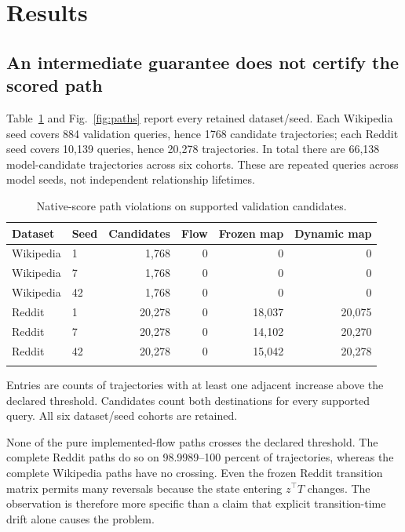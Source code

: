 \documentclass[pdflatex,sn-vancouver-num]{sn-jnl}
\theoremstyle{thmstyleone}
\begin{document}
\section{Results}\label{sec:results}
\subsection{An intermediate guarantee does not certify the scored path}
Table~\ref{tab:paths} and Fig.~\ref{fig:paths} report every retained dataset/seed. Each Wikipedia seed covers 884 validation queries, hence 1768 candidate trajectories; each Reddit seed covers 10,139 queries, hence 20,278 trajectories. In total there are 66,138 model-candidate trajectories across six cohorts. These are repeated queries across model seeds, not independent relationship lifetimes.

\begin{table}[t]
\caption{Native-score path violations on supported validation candidates.}\label{tab:paths}
\centering
\begin{tabular}{@{}llrrrr@{}}
\toprule
Dataset & Seed & Candidates & Flow & Frozen map & Dynamic map \\
\midrule
Wikipedia & 1 & 1,768 & 0 & 0 & 0 \\
Wikipedia & 7 & 1,768 & 0 & 0 & 0 \\
Wikipedia & 42 & 1,768 & 0 & 0 & 0 \\
Reddit & 1 & 20,278 & 0 & 18,037 & 20,075 \\
Reddit & 7 & 20,278 & 0 & 14,102 & 20,270 \\
Reddit & 42 & 20,278 & 0 & 15,042 & 20,278 \\
\botrule
\end{tabular}
\begin{tablenotes}[flushleft]\footnotesize\item Entries are counts of trajectories with at least one adjacent increase above the declared threshold. Candidates count both destinations for every supported query. All six dataset/seed cohorts are retained.\end{tablenotes}
\end{table}

None of the pure implemented-flow paths crosses the declared threshold. The complete Reddit paths do so on 98.9989--100 percent of trajectories, whereas the complete Wikipedia paths have no crossing. Even the frozen Reddit transition matrix permits many reversals because the state entering $z^\top T$ changes. The observation is therefore more specific than a claim that explicit transition-time drift alone causes the problem.
\end{document}
